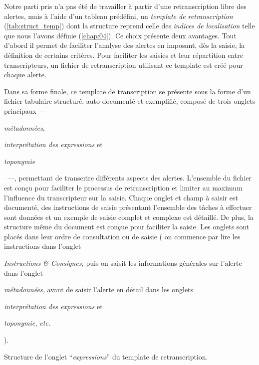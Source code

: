 Notre parti pris n'a pas été de travailler à partir d'une
retranscription libre des alertes, mais à l'aide d'un tableau
prédéfini, un \emph{template de retranscription}
(\autoref{tab:struct_temp}) dont la structure reprend celle des
\emph{indices de localisation} telle que nous l'avons définie
(\autoref{chap:04}). Ce choix présente deux avantages. Tout d'abord il
permet de faciliter l'analyse des alertes en imposant, dès la saisie,
la définition de certains critères. Pour faciliter les saisies et leur
répartition entre transcripteurs, un fichier de retranscription
utilisant ce template est créé pour chaque alerte.

Dans sa forme finale, ce template de transcription se présente sous la
forme d'un fichier tabulaire structuré, auto-documenté et exemplifié,
composé de trois onglets principaux
%
---~\begin{enumerate*}[label=(\alph*)]
\item \emph{métadonnées},
\item \emph{interprétation des expressions} et
\item \emph{toponymie}
\end{enumerate*}~---,
%
permettant de transcrire différents aspects des alertes. L'ensemble du
fichier est conçu pour faciliter le processus de retranscription et
limiter au maximum l'influence du transcripteur sur la saisie. Chaque
onglet et champ à saisir est documenté, des instructions de saisie
présentant l'ensemble des tâches à effectuer sont données et un
exemple de saisie complet et complexe est détaillé. De plus, la
structure même du document est conçue pour faciliter la saisie. Les
onglets sont placés dans leur ordre de consultation ou de saisie (\eg
on commence par lire les instructions dans l'onglet
%
\begin{enumerate*}[label=(\arabic*)]
\item \emph{Instructions \& Consignes,} puis on saisit les
  informations générales sur l'alerte dans l'onglet
\item \emph{métadonnées,} avant de saisir l'alerte en détail dans les
  onglets
\item \emph{interprétation des expressions} et
\item \emph{toponymie,} \emph{etc.}
\end{enumerate*}).

\begin{table}
  \centering
  
  \caption{Structure de l'onglet \enquote{\emph{expressions}} du
    template de retranscription.}
  \label{tab:struct_temp}
\end{table}

